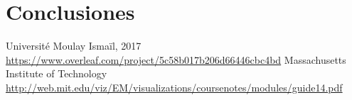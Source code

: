 \documentclass[%
 reprint,
 amsmath,amssymb,
 aps,
]{revtex4-1}
\begin{document}
\section{Conclusiones}


\begin{thebibliography}{9}
Université Moulay Ismaïl, 2017
\url{https://www.overleaf.com/project/5c58b017b206d66446cbc4bd}
Massachusetts Institute of Technology
\url{http://web.mit.edu/viz/EM/visualizations/coursenotes/modules/guide14.pdf}
\end{thebibliography}
\end{document}
